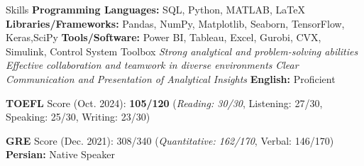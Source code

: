 \begin{rubric}{Skills}
\entry*%
    \textbf{Programming Languages:} SQL, Python, MATLAB, \LaTeX
\entry*%
    \textbf{Libraries/Frameworks:} Pandas, NumPy, Matplotlib, Seaborn, TensorFlow, Keras,SciPy 
\entry*%
    \textbf{Tools/Software:} Power BI, Tableau, Excel, Gurobi, CVX, Simulink, Control System Toolbox
\entry*%
    \textit{Strong analytical and problem-solving abilities}
\entry*%
    \textit{Effective collaboration and teamwork in diverse environments}
\entry*%
    \textit{Clear Communication and Presentation of Analytical Insights}
\entry*%
    \textbf{English:} Proficient  
    \par \textbf{TOEFL} Score (Oct. 2024): \textbf{105/120} (\textit{Reading: 30/30}, Listening: 27/30, Speaking: 25/30, Writing: 23/30)  
    \par \textbf{GRE} Score (Dec. 2021): 308/340 (\textit{Quantitative: 162/170}, Verbal: 146/170)
\entry*%
    \textbf{Persian:} Native Speaker
\end{rubric}


